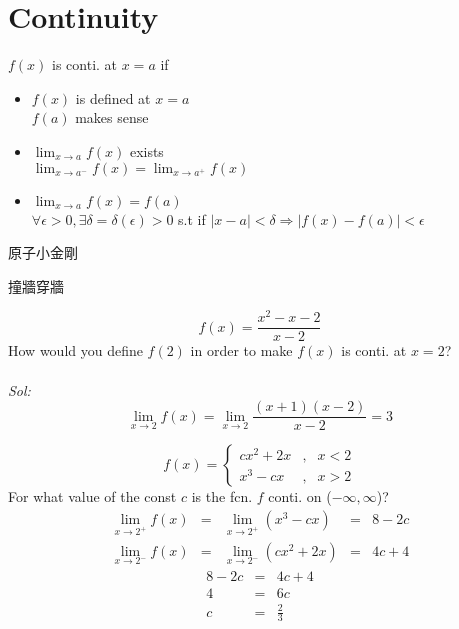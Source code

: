 \section{Continuity}
\begin{defn}
$f(x)$ is conti. at $x = a$ if 
\begin{itemize}
\item $f(x)$ is defined at $x = a$ \\ $f(a)$ makes sense
\item $\displaystyle \lim_{x \to a} f(x)$ exists \\$\displaystyle \lim_{x \to a^{-}} f(x) = \lim_{x \to a^{+}} f(x)$
\item $\displaystyle \lim_{x \to a} f(x) = f(a)$ \\$\forall \epsilon > 0, \exists \delta = \delta(\epsilon) > 0$ s.t if $\mid x -a \mid < \delta \Rightarrow \mid f(x) - f(a) \mid < \epsilon$
\end{itemize}
\end{defn}

\begin{jk}{}
原子小金剛

撞牆穿牆
\end{jk}

\begin{eg}
$$\displaystyle f(x) = \frac{x^2 - x -2}{x - 2}$$
How would you define $f(2)$ in order to make $f(x)$ is conti. at $x = 2$?\\\\
\textit{Sol:}\\
$$\displaystyle \lim_{x \to 2} f(x) = \lim_{x \to 2} \frac{(x + 1)(x -2)}{x - 2} = 3$$
\end{eg}
\begin{eg}
$$f(x) = \left \{ \begin{array}{rcl}
cx^2 + 2x & \mbox{,} & x < 2\\
x^3 - cx & \mbox{,} & x > 2
\end{array} \right.$$
For what value of the const $c$ is the fcn. $f$ conti. on ($- \infty, \infty$)?\\
$$\begin{array}{rcccl}
\displaystyle \lim_{x \to 2^{+}} f(x) & = & \displaystyle \lim_{x \to 2^{+}} (x^3 - cx) & = & 8 - 2c\\
\displaystyle \lim_{x \to 2^{-}} f(x) & = & \displaystyle \lim_{x \to 2^{-}} (cx^2 +2x) & = & 4c +4
\end{array}$$
$$\begin{array}{rcl}
8 - 2c & = & 4c + 4\\
4 & = & 6c\\
c & = & \displaystyle \frac{2}{3}
\end{array}$$
\end{eg}

